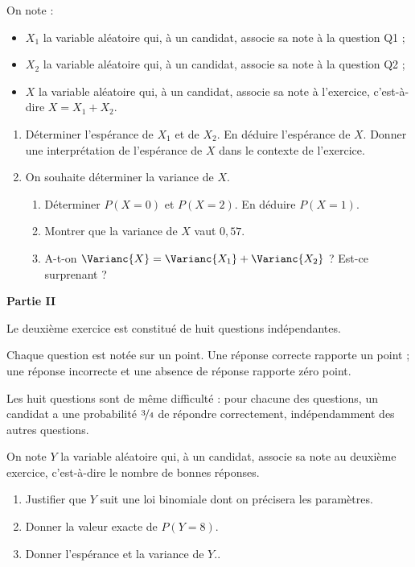 On note :

\begin{itemize}
	\item $X_1$ la variable aléatoire qui, à un candidat, associe sa note à la question Q1 ;
	\item $X_2$ la variable aléatoire qui, à un candidat, associe sa note à la question Q2 ;
	\item $X$ la variable aléatoire qui, à un candidat, associe sa note à l’exercice, c’est-à-dire $X=X_1+X_2$.
\end{itemize}

\begin{enumerate}[resume]
	\item Déterminer l’espérance de $X_1$ et de $X_2$. En déduire l’espérance de $X$. Donner une interprétation de l’espérance de $X$ dans le contexte de l’exercice.
	\item On souhaite déterminer la variance de $X$.
	\begin{enumerate}
		\item Déterminer $P(X=0)$ et $P(X=2)$. En déduire $P(X=1)$.
		\item Montrer que la variance de $X$ vaut $0,57$.
		\item A-t-on $\Varianc{X} = \Varianc{X_1} + \Varianc{X_2}$ ? Est-ce surprenant ?
	\end{enumerate}
\end{enumerate}

\medskip

\textbf{\large Partie II}

\medskip

Le deuxième exercice est constitué de huit questions indépendantes.

\smallskip

Chaque question est notée sur un point. Une réponse correcte rapporte un point ; une réponse incorrecte et une absence de réponse rapporte zéro point.

\smallskip

Les huit questions sont de même difficulté : pour chacune des questions, un candidat a une probabilité $\nicefrac{3}{4}$ de répondre correctement, indépendamment des autres questions.

\smallskip

On note $Y$ la variable aléatoire qui, à un candidat, associe sa note au deuxième exercice, c’est-à-dire le nombre de bonnes réponses.

\begin{enumerate}
	\item Justifier que $Y$ suit une loi binomiale dont on précisera les paramètres.
	\item Donner la valeur exacte de $P(Y=8)$.
	\item Donner l’espérance et la variance de $Y$..
\end{enumerate}

